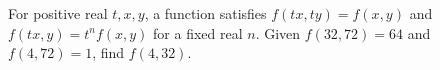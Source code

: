 For positive real $t,x,y$, a function satisfies $f(tx,ty)=f(x,y)$ and $f(tx,y)=t^n f(x,y)$ for a fixed real $n$. Given $f(32,72)=64$ and $f(4,72)=1$, find $f(4,32)$.
